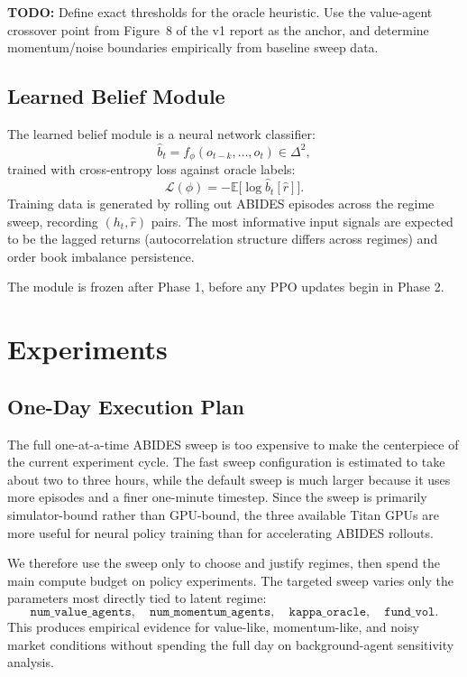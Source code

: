 \documentclass[11pt]{article}
\begin{document}
\noindent\textbf{TODO:} Define exact thresholds for the oracle heuristic. Use the value-agent
crossover point from Figure~8 of the v1 report as the anchor, and determine momentum/noise
boundaries empirically from baseline sweep data.

\subsection{Learned Belief Module}

The learned belief module is a neural network classifier:
\[
\hat{b}_t = f_\phi(o_{t-k}, \ldots, o_t) \in \Delta^2,
\]
trained with cross-entropy loss against oracle labels:
\[
\mathcal{L}(\phi) = -\mathbb{E}\bigl[\log \hat{b}_t[\hat{r}]\bigr].
\]
Training data is generated by rolling out ABIDES episodes across the regime sweep, recording
$(h_t, \hat{r})$ pairs. The most informative input signals are expected to be the lagged returns
(autocorrelation structure differs across regimes) and order book imbalance persistence.

The module is frozen after Phase 1, before any PPO updates begin in Phase 2.

\section{Experiments}

\subsection{One-Day Execution Plan}

The full one-at-a-time ABIDES sweep is too expensive to make the centerpiece of the current
experiment cycle. The fast sweep configuration is estimated to take about two to three hours, while
the default sweep is much larger because it uses more episodes and a finer one-minute timestep. Since
the sweep is primarily simulator-bound rather than GPU-bound, the three available Titan GPUs are more
useful for neural policy training than for accelerating ABIDES rollouts.

We therefore use the sweep only to choose and justify regimes, then spend the main compute budget on
policy experiments. The targeted sweep varies only the parameters most directly tied to latent regime:
\[
\texttt{num\_value\_agents},\quad
\texttt{num\_momentum\_agents},\quad
\texttt{kappa\_oracle},\quad
\texttt{fund\_vol}.
\]
This produces empirical evidence for value-like, momentum-like, and noisy market conditions without
spending the full day on background-agent sensitivity analysis.
\end{document}
